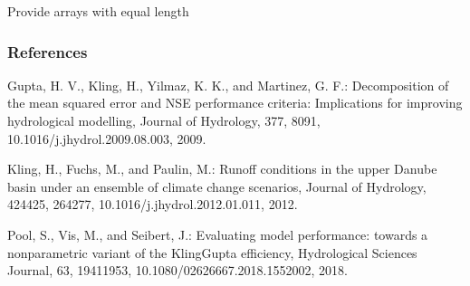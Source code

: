 \documentclass[letterpaper,10pt,english]{sphinxmanual}
\begin{document}
\begin{fulllineitems}
Provide arrays with equal length

\begin{sphinxVerbatim}[commandchars=\\\{\}]
   
   
  \PYG{p}{[}     \PYG{p}{]}
  \PYG{p}{[}     \PYG{p}{]}
 
\end{sphinxVerbatim}
\subsubsection*{References}

Gupta, H. V., Kling, H., Yilmaz, K. K., and Martinez, G. F.: Decomposition
of the mean squared error and NSE performance criteria: Implications for
improving hydrological modelling, Journal of Hydrology, 377, 80\sphinxhyphen{}91,
10.1016/j.jhydrol.2009.08.003, 2009.

Kling, H., Fuchs, M., and Paulin, M.: Runoff conditions in the upper
Danube basin under an ensemble of climate change scenarios, Journal of
Hydrology, 424\sphinxhyphen{}425, 264\sphinxhyphen{}277, 10.1016/j.jhydrol.2012.01.011, 2012.

Pool, S., Vis, M., and Seibert, J.: Evaluating model performance: towards a
non\sphinxhyphen{}parametric variant of the Kling\sphinxhyphen{}Gupta efficiency, Hydrological Sciences
Journal, 63, 1941\sphinxhyphen{}1953, 10.1080/02626667.2018.1552002, 2018.

\end{fulllineitems}

\end{document}
